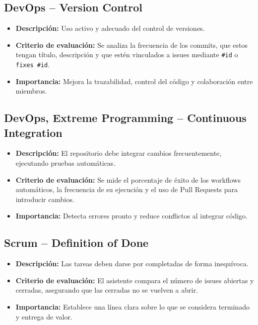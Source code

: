 \subsection{DevOps – Version Control}

\begin{itemize}
  \item \textbf{Descripción:} Uso activo y adecuado del control de versiones.
  \item \textbf{Criterio de evaluación:} Se analiza la frecuencia de los commits, que estos tengan título, descripción y que estén vinculados a issues mediante \texttt{\#id} o \texttt{fixes \#id}.
  \item \textbf{Importancia:} Mejora la trazabilidad, control del código y colaboración entre miembros.
\end{itemize}

\subsection{DevOps, Extreme Programming – Continuous Integration}

\begin{itemize}
  \item \textbf{Descripción:} El repositorio debe integrar cambios frecuentemente, ejecutando pruebas automáticas.
  \item \textbf{Criterio de evaluación:} Se mide el porcentaje de éxito de los workflows automáticos, la frecuencia de su ejecución y el uso de Pull Requests para introducir cambios.
  \item \textbf{Importancia:} Detecta errores pronto y reduce conflictos al integrar código.
\end{itemize}

\subsection{Scrum – Definition of Done}

\begin{itemize}
  \item \textbf{Descripción:} Las tareas deben darse por completadas de forma inequívoca.
  \item \textbf{Criterio de evaluación:} El asistente compara el número de issues abiertas y cerradas, asegurando que las cerradas no se vuelven a abrir.
  \item \textbf{Importancia:} Establece una línea clara sobre lo que se considera terminado y entrega de valor.
\end{itemize}

